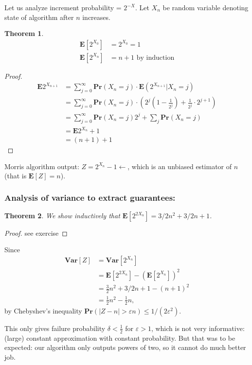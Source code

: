 \documentclass[11pt]{article}
\newcommand{\Ppb}{\mathbf{Pr}}
\newcommand{\Es}{\mathbf{E}}
\newcommand{\Var}{\mathbf{Var}}
\newtheorem{theorem}{Theorem}
\begin{document}
Let us analyze increment probability = $2^{-X}$. Let $X_n$ be random variable denoting state of algorithm after $n$ increases.
\begin{theorem}
\begin{align}
    \Es[2^{X_0}] &= 2^{X_0} = 1 \\
    \Es[2^{X_n}] &= n+1 \text{  by induction}
\end{align}
\end{theorem}
\begin{proof}
\begin{align*} \Es 2^{X_{n+1}} &=\sum_{j=0}^{\infty} \Ppb \left(X_{n}=j\right) \cdot \Es \left(2^{X_{n+1}} | X_{n}=j\right) \\ &=\sum_{j=0}^{\infty} \Ppb \left(X_{n}=j\right) \cdot\left(2^{j}\left(1-\frac{1}{2^{j}}\right)+\frac{1}{2^{j}} \cdot 2^{j+1}\right) \\ &=\sum_{j=0}^{\infty} \Ppb \left(X_{n}=j\right) 2^{j}+\sum_{j} \Ppb \left(X_{n}=j\right) \\ &=\Es 2^{X_{n}}+1 \\ &=(n+1)+1 \end{align*}
\end{proof}

Morris algorithm output: $Z = 2^{X_{n}}-1   \leftarrow$, which is an unbiased estimator of $n$ (that is $\Es[Z] = n$).

\subsubsection{Analysis of variance to extract guarantees:}

\begin{theorem}
We show inductively that $\Es[2^{2X_n}] = 3/2 n^2 + 3/2 n + 1$.
\end{theorem}
\begin{proof}
see exercise
\end{proof}

Since
\begin{align*}
    \Var[Z] &= \Var[2^{X_n}] \\
    &= \Es[2^{2 X_n} ] - (\Es[2^{X_n}])^2 \\
    &= \frac{3}{2} n^2 + 3/2 n + 1 - (n+1)^2 \\
    &= \frac{1}{2} n^2 - \frac{1}{2}n,
\end{align*}
by Chebyshev’s inequality $\Ppb( |Z-n| > \varepsilon n) \leq 1/(2 \varepsilon^2)$.

This only gives failure probability $\delta < \frac{1}{2}$ for $\varepsilon > 1$, which is not very informative: (large) constant approximation with constant probability. But that was to be expected: our algorithm only outputs powers of two, so it cannot do much better job.
\end{document}
